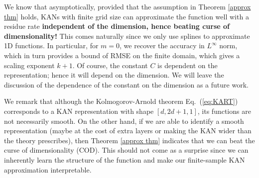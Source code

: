 \documentclass{article}
\numberwithin{equation}{section}
\numberwithin{figure}{section}
\begin{document}
We know that asymptotically, provided that the assumption in Theorem \ref{approx thm} holds, KANs with finite grid size can approximate the function well with a residue rate {\bf independent of the dimension, hence beating curse of dimensionality!}   This comes naturally since we only use splines to approximate 1D functions.  In particular, for $m=0$, we recover the accuracy in $L^\infty$ norm, which in turn provides a bound of RMSE on the finite domain, which gives a scaling exponent $k+1$. Of course, the constant $C$ is dependent on the representation; hence it will depend on the dimension. We will leave the discussion of the dependence of the constant on the dimension as a future work.


We remark that although the Kolmogorov-Arnold theorem Eq.~(\ref{eq:KART}) corresponds to a KAN representation with shape $[d,2d+1,1]$, its functions are not necessarily smooth. On the other hand, if we are able to identify a smooth representation (maybe at the cost of extra layers or making the KAN wider than the theory prescribes), then Theorem \ref{approx thm} indicates that we can beat the curse of dimensionality (COD). This should not come as a surprise since we can inherently learn the structure of the function and make our finite-sample KAN approximation interpretable.
\end{document}
